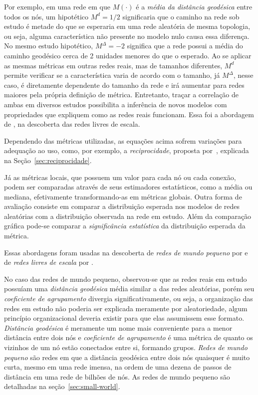 \documentclass[12pt,a4paper]{article}
\theoremstyle{hypo}
\begin{document}
Por exemplo, em uma rede em que $M(\cdot)$ é a \textit{média da distância geodésica} entre todos os nós, um hipotético $M^d = 1/2$ significaria que o caminho na rede sob estudo é metade do que se esperaria em uma rede aleatória de mesma topologia, ou seja, alguma característica não presente no modelo nulo causa essa diferença. No mesmo estudo hipotético, $M^\Delta = -2$ significa que a rede possui a média do caminho geodésico cerca de 2 unidades menores do que o esperado. Ao se aplicar as mesmas métricas em outras redes reais, mas de tamanhos diferentes, $M^d$ permite verificar se a característica varia de acordo com o tamanho, já $M^\Delta$, nesse caso, é diretamente dependente do tamanho da rede e irá aumentar para redes maiores pela própria definição de métrica. Entretanto, traçar a correlação de ambas em diversos estudos possibilita a inferência de novos modelos com propriedades que expliquem como as redes reais funcionam. Essa foi a abordagem de \cite{Barabasi1999-sn}, na descoberta das redes livres de escala. 

Dependendo das métricas utilizadas, as equações acima sofrem variações para adequação ao uso, como, por exemplo, a \textit{reciprocidade}, proposta por~, explicada na Seção~\ref{sec:reciprocidade}.

Já as métricas locais, que possuem um valor para cada nó ou cada conexão, podem ser comparadas através de seus estimadores estatísticos, como a média ou mediana, efetivamente transformando-as em métricas globais. Outra forma de avaliação consiste em comparar a distribuição esperada nos modelos de redes aleatórias com a distribuição observada na rede em estudo. Além da comparação gráfica pode-se comparar a \textit{significância estatística} da distribuição esperada da métrica.


Essas abordagens foram usadas na descoberta de \textit{redes de mundo pequeno} por  e de \textit{redes livres de escala} por .

No caso das redes de mundo pequeno, observou-se que as redes reais em estudo possuíam uma \textit{distância geodésica} média similar a das redes aleatórias, porém seu \textit{coeficiente de agrupamento} divergia significativamente, ou seja, a organização das redes em estudo não poderia ser explicada meramente por aleatoriedade, algum princípio organizacional deveria existir para que elas assumissem esse formato. \textit{Distância geodésica} é meramente um nome mais conveniente para a menor distância entre dois nós e \textit{coeficiente de agrupamento} é uma métrica de quanto os vizinhos de um nó estão conectados entre si, formando grupos. \textit{Redes de mundo pequeno} são redes em que a distância geodésica entre dois nós quaisquer é muito curta, mesmo em uma rede imensa, na ordem de uma dezena de passos de distância em uma rede de bilhões de nós. As redes de mundo pequeno são detalhadas na seção~\ref{sec:small-world}. 
\end{document}
